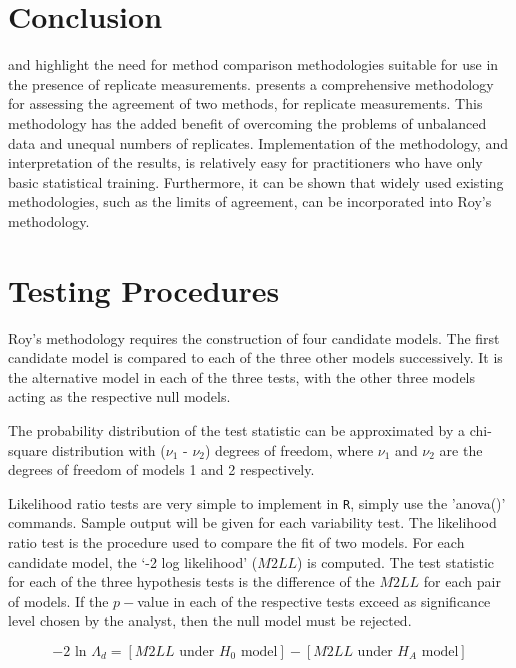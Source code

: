 \documentclass[12pt, a4paper]{report}
\theoremstyle{plain}
\theoremstyle{definition}
\theoremstyle{remark}
\begin{document}
\section{Conclusion}
\citet{BXC2008} and \citet{roy} highlight the need for method comparison methodologies suitable for use in the presence of replicate measurements. \citet{roy} presents a comprehensive methodology for assessing the agreement of two methods, for replicate measurements. This methodology has the added benefit of overcoming the problems of unbalanced data and unequal numbers of replicates. Implementation of the methodology, and interpretation of the results, is relatively easy for practitioners who have only basic statistical training. Furthermore, it can be shown that widely used existing methodologies, such as the limits of agreement, can be incorporated into Roy's methodology.




\section{Testing Procedures}
Roy's methodology requires the construction of four candidate models. The first candidate model is compared to each of the three other models successively. It is the alternative model in each of the three tests, with the other three models acting as the respective null models.


The probability distribution of the test statistic can be approximated by a chi-square distribution with ($\nu_1$ - $\nu_2$) degrees of freedom, where $\nu_1$ and $\nu_2$ are the degrees of freedom of models 1 and 2 respectively.

Likelihood ratio tests are very simple to implement in \texttt{R}, simply use the 'anova()' commands. Sample output will be given for each variability test.
The likelihood ratio test is the procedure used to compare the fit of two models. For each candidate model, the `-2 log likelihood' ($M2LL$) is computed. The test statistic for each of the three hypothesis tests is the difference of the $M2LL$ for each pair of models. If the $p-$value in each of the respective tests exceed as significance level chosen by the analyst, then the null model must be rejected.

\begin{equation}
-2\mbox{ ln }\Lambda_{d} =  [ M2LL \mbox{ under }H_{0} \mbox{ model}] - [ M2LL \mbox{ under }H_{A} \mbox{ model}]
\end{equation}
\end{document}
